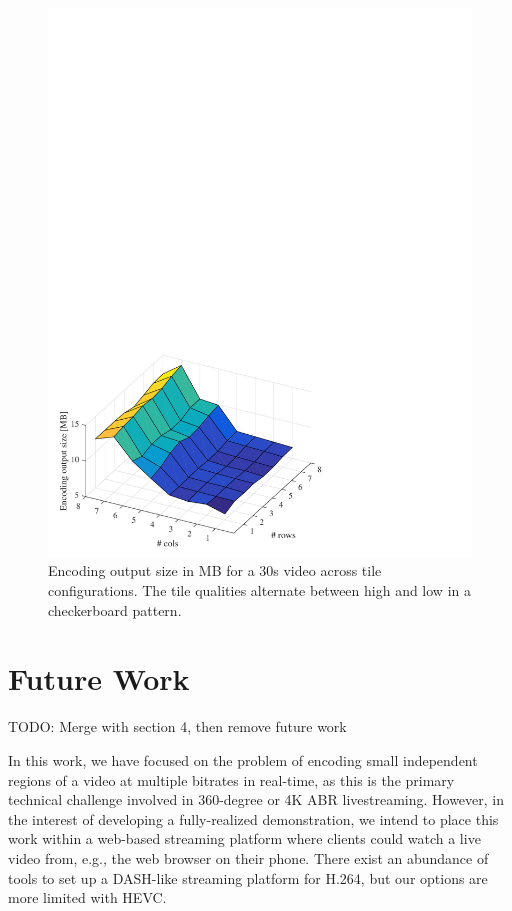 \begin{figure}[t]
	\includegraphics[width=\columnwidth]{figures/sizes_v1.pdf}
	\caption{Encoding output size in MB for a 30s video across tile configurations. The tile qualities alternate between high and low in a checkerboard pattern. }
	\label{fig:size}
\end{figure}



\section{Future Work}

TODO: Merge with section 4, then remove future work

In this work, we have focused on the problem of encoding small independent regions of a video at multiple bitrates in real-time, as this is the primary technical challenge involved in 360-degree or 4K ABR livestreaming. However, in the interest of developing a fully-realized demonstration, we intend to place this work within a web-based streaming platform where clients could watch a live video from, e.g., the web browser on their phone. There exist an abundance of tools to set up a DASH-like streaming platform for H.264, but our options are more limited with HEVC.

